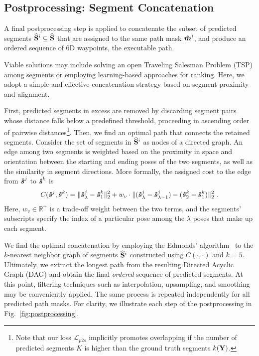 \subsection{Postprocessing: Segment Concatenation}
\label{sec:postprocessing}
%
A final postprocessing step is applied to concatenate the subset of predicted segments $\mathbf{\widehat{S}}^i \subseteq \mathbf{\widehat{S}}$ that are assigned to the same path mask $\boldsymbol{\hat{m}}^i$, and produce an ordered sequence of 6D waypoints, \ie the executable path.

Viable solutions may include solving an open Traveling Salesman Problem (TSP) among segments or employing learning-based approaches for ranking. Here, we adopt a simple and effective concatenation strategy based on segment proximity and alignment. 

First, predicted segments in excess are removed by discarding segment pairs whose distance falls below a predefined threshold, proceeding in ascending order of pairwise distances\footnote{Note that our loss $\mathcal{L}_{p2s}$ implicitly promotes overlapping if the number of predicted segments $K$ is higher than the ground truth segments $k(\mathbf{Y})$.}. 
%
Then, we find an optimal path that connects the retained segments. Consider the set of segments in $\mathbf{\widehat{S}}^i$ as nodes of a directed graph. An edge among two segments is weighted based on the proximity in space and orientation between the starting and ending poses of the two segments, as well as the similarity in segment directions.
More formally, the assigned cost to the edge from $\boldsymbol{\hat{s}}^j$ to $\boldsymbol{\hat{s}}^k$ is 
\begin{equation}
\label{eq:cost}
    C(\boldsymbol{\hat{s}}^j,\boldsymbol{\hat{s}}^k) = \| \boldsymbol{\hat{s}}^j_\lambda - \boldsymbol{\hat{s}}^k_1 \|_2^2 + w_v \cdot \| (\boldsymbol{\hat{s}}^j_\lambda - \boldsymbol{\hat{s}}^j_{\lambda-1}) - (\boldsymbol{\hat{s}}^k_2 - \boldsymbol{\hat{s}}^k_1)  \|_2^2~.
\end{equation}
Here, $w_v \in \mathbb{R}^+$ is a trade-off weight between the two terms, and the segments' subscripts specify the index of a particular pose among the $\lambda$ poses that make up each segment.

We find the optimal concatenation by employing the Edmonds' algorithm~\cite{edmonds1967optimum} to the $k$-nearest neighbor graph of segments $\mathbf{\widehat{S}}^i$ constructed using $C(\cdot, \cdot)$ and $k{=}5$.
Ultimately, we extract the longest path from the resulting Directed Acyclic Graph (DAG) and obtain the final \emph{ordered} sequence of predicted segments.
At this point, filtering techniques such as interpolation, upsampling, and smoothing may be conveniently applied.
The same process is repeated independently for all predicted path masks.
For clarity, we illustrate each step of the postprocessing in Fig.~\ref{fig:postprocessing}.